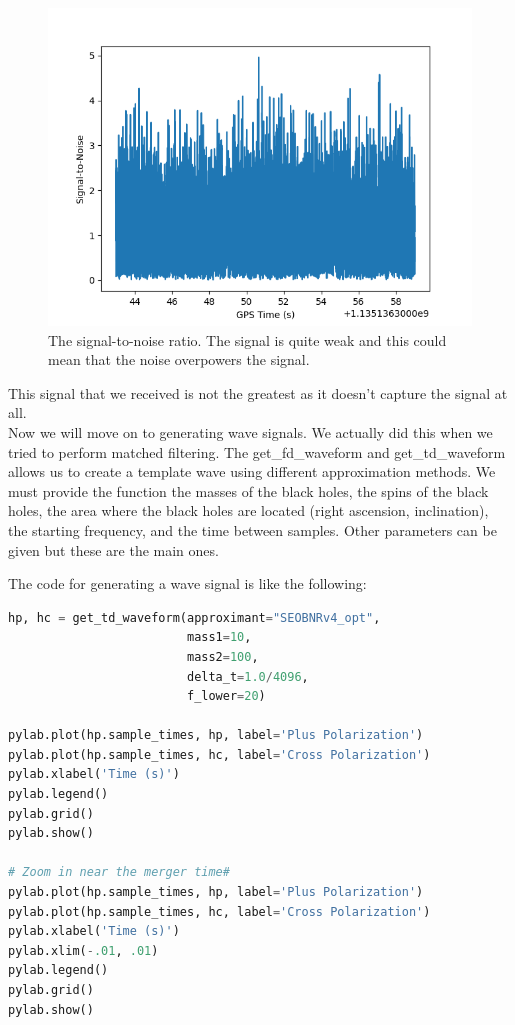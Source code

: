 \documentclass[]{article}
\begin{document}
\begin{figure}[H]
	\begin{center}
		\includegraphics[scale=1]{SNR.png}
	\end{center}
	\caption{The signal-to-noise ratio. The signal is quite weak and this could mean that the noise overpowers the signal.}
	\label{fig:SNR}
\end{figure}

This signal that we received is not the greatest as it doesn't capture the signal at all. \\

Now we will move on to generating wave signals. We actually did this when we tried to perform matched filtering. The get\_fd\_waveform and get\_td\_waveform allows us to create a template wave using different approximation methods. We must provide the function the masses of the black holes, the spins of the black holes, the area where the black holes are located (right ascension, inclination), the starting frequency, and the time between samples. Other parameters can be given but these are the main ones.
 
The code for generating a wave signal is like the following:

\begin{lstlisting}[language = Python]
hp, hc = get_td_waveform(approximant="SEOBNRv4_opt",
                         mass1=10,
                         mass2=100,
                         delta_t=1.0/4096,
                         f_lower=20)

pylab.plot(hp.sample_times, hp, label='Plus Polarization')
pylab.plot(hp.sample_times, hc, label='Cross Polarization')
pylab.xlabel('Time (s)')
pylab.legend()
pylab.grid()
pylab.show()

# Zoom in near the merger time#
pylab.plot(hp.sample_times, hp, label='Plus Polarization')
pylab.plot(hp.sample_times, hc, label='Cross Polarization')
pylab.xlabel('Time (s)')
pylab.xlim(-.01, .01)
pylab.legend()
pylab.grid()
pylab.show()
\end{lstlisting}
\end{document}
